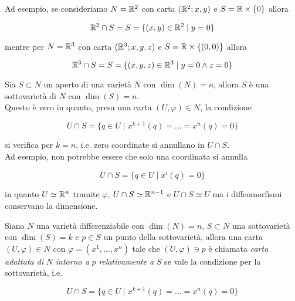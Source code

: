 Ad esempio, se consideriamo $ N = \mathbb{R}^{2} $ con carta $ (\mathbb{R}^{2};x,y) $ e $ S = \mathbb{R} \times \{0\} $ allora

\begin{equation}
	\mathbb{R}^{2} \cap S = S = \{ (x,y) \in \mathbb{R}^{2} \mid y=0 \}
\end{equation}

mentre per $ N = \mathbb{R}^{3} $ con carta $ (\mathbb{R}^{3};x,y,z) $ e $ S = \mathbb{R} \times \{(0,0)\} $ allora

\begin{equation}
	\mathbb{R}^{3} \cap S = S = \{ (x,y,z) \in \mathbb{R}^{3} \mid y = 0 \wedge z = 0 \}
\end{equation}

\begin{remark}\label{rem:subvar-open}
	Sia $ S \subset N $ un aperto di una varietà $ N $ con $ \dim(N)=n $, allora $ S $ è una sottovarietà di $ N $ con $ \dim(S)=n $. \\
	Questo è vero in quanto, presa una carta $ (U,\varphi) \in N $, la condizione
	
	\begin{equation}
		U \cap S = \{ q \in U \mid x^{k+1}(q) = \dots = x^{n}(q) = 0 \}
	\end{equation}

	si verifica per $ k=n $, i.e. zero coordinate si annullano in $ U \cap S $. \\
	Ad esempio, non potrebbe essere che solo una coordinata si annulla
	
	\begin{equation}
		U \cap S = \{ q \in U \mid x^{i}(q) = 0 \}
	\end{equation}

	in quanto $ U \simeq \mathbb{R}^{n} $ tramite $ \varphi $, $ U \cap S \simeq \mathbb{R}^{n-1} $ e $ U \cap S \simeq U $ ma i diffeomorfismi conservano la dimensione.
\end{remark}

Siano $ N $ una varietà differenziabile con $ \dim(N)=n $, $ S \subset N $ una sottovarietà con $ \dim(S)=k $ e $ p \in S $ un punto della sottovarietà, allora una carta $ (U,\varphi) \in N $ con $ \varphi = (x^{1},\dots,x^{n}) $ tale che $ (U,\varphi) \ni p $ è chiamata \textit{carta adattata di} $ N $ \textit{intorno a} $ p $ \textit{relativamente a} $ S $ se vale la condizione per la sottovarietà, i.e.

\begin{equation}
	U \cap S = \{ q \in U \mid x^{k+1}(q) = \dots = x^{n}(q) = 0 \}
\end{equation}

